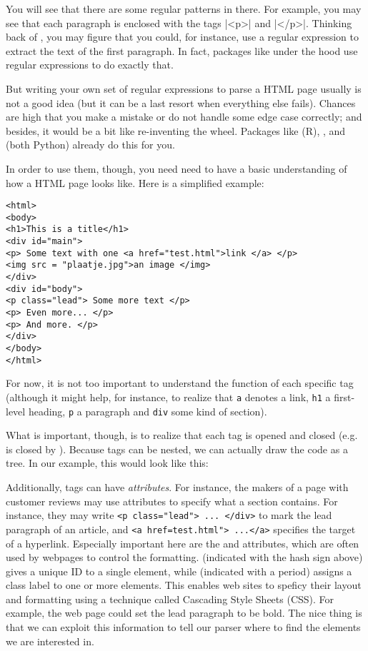You will see that there are some regular patterns in there. For
example, you may see that each paragraph is enclosed with the tags
|<p>| and |</p>|. Thinking back of , you may figure
that you could, for instance, use a regular expression to extract
the text of the first paragraph. In fact, packages like 
under the hood use regular expressions to do exactly that.

But writing your own set of regular expressions to parse a HTML
page usually is not a good idea (but it can be a last resort when
everything else fails). Chances are high that you make
a mistake or do not handle some edge case correctly; and besides,
it would be a bit like re-inventing the wheel. Packages like
 (R), , and  (both Python)
already do this for you.

In order to use them, though, you need need to have a basic
understanding of how a HTML page looks like. Here is a simplified
example:

\begin{lstlisting}
<html>
<body>
<h1>This is a title</h1>
<div id="main">
<p> Some text with one <a href="test.html">link </a> </p>
<img src = "plaatje.jpg">an image </img>
</div>
<div id="body">
<p class="lead"> Some more text </p>
<p> Even more... </p>
<p> And more. </p>
</div>
</body>
</html>
\end{lstlisting}

For now, it is not too important to understand the function of each
specific tag (although it might help, for instance, to realize that
\texttt{a} denotes a link, \texttt{h1} a first-level heading,
\texttt{p} a paragraph and \texttt{div} some kind of section).

What is important, though, is to realize that each tag is opened and
closed (e.g.  is closed by ).
Because tags can be nested, we can actually
draw the code as a tree. In our example, this would look like this:



Additionally, tags can have \emph{attributes}. For instance, the
makers of a page with customer reviews may use attributes to specify
what a section contains. For instance, they may write
\texttt{<p class="lead"> ... </div>}  to mark the lead paragraph of an article,
and \texttt{<a href=test.html"> ...</a>} specifies the target of a hyperlink.
Especially important here are the  and  attributes,
which are often used by webpages to control the formatting.
 (indicated with the hash sign \ttt{\#} above) gives a unique ID to a single element,
while  (indicated with a period) assigns a class label to one or more elements.
This enables web sites to speficy their layout and formatting using a technique called Cascading Style Sheets (CSS).
For example, the web page could set the lead paragraph to be bold.
The nice thing is that we can exploit
this information to tell our parser where to find the elements we
are interested in.

